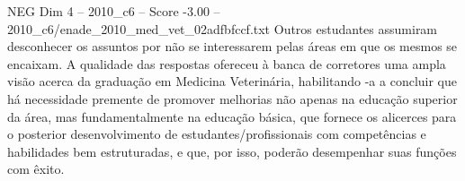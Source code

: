\begin{textsample}{NEG Dim 4 – 2010\_c6 – Score -3.00 – 2010\_c6/enade\_2010\_med\_vet\_02adfbfccf.txt}
Outros estudantes assumiram desconhecer os assuntos por não se interessarem pelas áreas em que os mesmos se encaixam.
A qualidade das respostas ofereceu à banca de corretores uma ampla visão acerca da graduação em Medicina Veterinária, habilitando -a a concluir que há necessidade premente de promover melhorias não apenas na educação superior da área, mas fundamentalmente na educação básica, que fornece os alicerces para o posterior desenvolvimento de estudantes/profissionais com competências e habilidades bem estruturadas, e que, por isso, poderão desempenhar suas funções com êxito.

\end{textsample}
